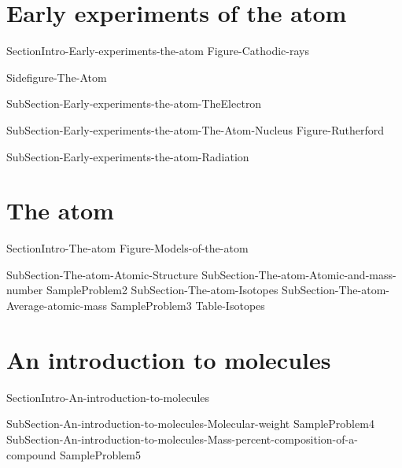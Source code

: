 \documentclass[main.tex]{subfiles}
\newcommand\chapterlabel{Ch-Table}\setcounter{figurenewcounter}{0}\setcounter{tablenewcounter}{0}\setcounter{formulanewcounter}{0}
\begin{document}
\section{Early experiments of the atom}
{SectionIntro-Early-experiments-the-atom}
{Figure-Cathodic-rays}
\sloppy\begin{description}
{Sidefigure-The-Atom}
\item[\docfilehook{Charge to mass ratio of an electron}{}] {SubSection-Early-experiments-the-atom-TheElectron}
\item[\docfilehook{The atom nucleus}{}] {SubSection-Early-experiments-the-atom-The-Atom-Nucleus}
{Figure-Rutherford}
\item[\docfilehook{Radiation}{}] {SubSection-Early-experiments-the-atom-Radiation}
\end{description}
 
\section{The atom}
{SectionIntro-The-atom}
 {Figure-Models-of-the-atom}
\sloppy\begin{description}
{SubSection-The-atom-Atomic-Structure}
{SubSection-The-atom-Atomic-and-mass-number}
{SampleProblem2}
{SubSection-The-atom-Isotopes}
{SubSection-The-atom-Average-atomic-mass}
{SampleProblem3}
 {Table-Isotopes}
\end{description}



\section{An introduction to molecules}%
{SectionIntro-An-introduction-to-molecules}%
\sloppy\begin{description}%
{SubSection-An-introduction-to-molecules-Molecular-weight}%
{SampleProblem4}%
{SubSection-An-introduction-to-molecules-Mass-percent-composition-of-a-compound}%
{SampleProblem5}%
\end{description}%
\end{document}

